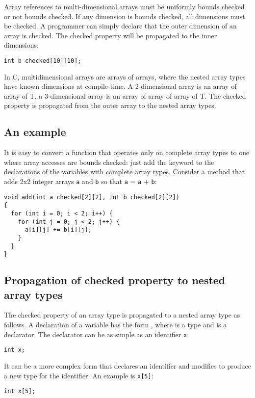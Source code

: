 Array references to multi-dimensional arrays must be uniformly bounds
checked or not bounds checked. If any dimension is bounds checked, all
dimensions must be checked. A programmer can simply declare that
the outer dimension of an array is checked.  The checked property will be 
propagated to the inner dimensions:

\begin{lstlisting}
int b checked[10][10];
\end{lstlisting}

In C, multidimensional arrays are arrays of arrays,
where the nested array types have known dimensions at compile-time. A
2-dimensional array is an array of array of T, a 3-dimensional array is
an array of array of array of T. The checked property is propagated from the
outer array to the nested array types.

\subsection{An example}

It is easy to convert a function that operates only on complete array
types to one where array accesses are bounds checked: just add the
 keyword to the declarations of the variables with complete array
types. Consider a method that adds 2x2 integer arrays \lstinline+a+ and
\lstinline+b+ so that \lstinline+a+ = \lstinline+a+ + \lstinline+b+:

\begin{lstlisting}
void add(int a checked[2][2], int b checked[2][2])
{
  for (int i = 0; i < 2; i++) {
    for (int j = 0; j < 2; j++) {
      a[i][j] += b[i][j];
    }
  }
}
\end{lstlisting}

\subsection{Propagation of checked property to nested array types}
The checked property of an array type is propagated to a nested array type as follows.
A declaration of a variable has the form  ,
where  is a type and  is a declarator. The declarator
can be as simple as an identifier \lstinline+x+:
\begin{lstlisting}
int x;
\end{lstlisting}
It can be a more complex form that declares an identifier and modifies 
to produce a new type for the identifier. An example is \lstinline+x[5]+:
\begin{lstlisting}
int x[5];
\end{lstlisting}

